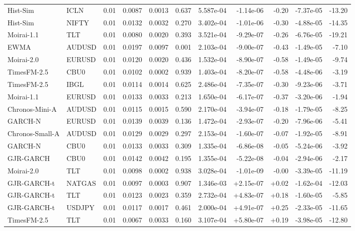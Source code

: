 \begin{tabular}{llrrrrrrrrr}
Hist-Sim & ICLN & 0.01 & 0.0087 & 0.0013 & 0.637 & 5.587e-04 & -1.14e-06 & -0.20 & -7.37e-05 & -13.20 \\
Hist-Sim & NIFTY & 0.01 & 0.0132 & 0.0032 & 0.270 & 3.402e-04 & -1.01e-06 & -0.30 & -4.88e-05 & -14.35 \\
Moirai-1.1 & TLT & 0.01 & 0.0080 & 0.0020 & 0.393 & 3.521e-04 & -9.29e-07 & -0.26 & -6.76e-05 & -19.21 \\
EWMA & AUDUSD & 0.01 & 0.0197 & 0.0097 & 0.001 & 2.103e-04 & -9.00e-07 & -0.43 & -1.49e-05 & -7.10 \\
Moirai-2.0 & EURUSD & 0.01 & 0.0120 & 0.0020 & 0.436 & 1.532e-04 & -8.90e-07 & -0.58 & -1.49e-05 & -9.74 \\
TimesFM-2.5 & CBU0 & 0.01 & 0.0102 & 0.0002 & 0.939 & 1.403e-04 & -8.20e-07 & -0.58 & -4.48e-06 & -3.19 \\
TimesFM-2.5 & IBGL & 0.01 & 0.0114 & 0.0014 & 0.625 & 2.486e-04 & -7.35e-07 & -0.30 & -9.23e-06 & -3.71 \\
Moirai-1.1 & EURUSD & 0.01 & 0.0133 & 0.0033 & 0.213 & 1.650e-04 & -6.17e-07 & -0.37 & -3.20e-06 & -1.94 \\
Chronos-Mini-A & AUDUSD & 0.01 & 0.0115 & 0.0015 & 0.590 & 2.170e-04 & -3.94e-07 & -0.18 & -1.79e-05 & -8.25 \\
GARCH-N & EURUSD & 0.01 & 0.0139 & 0.0039 & 0.136 & 1.472e-04 & -2.93e-07 & -0.20 & -7.96e-06 & -5.41 \\
Chronos-Small-A & AUDUSD & 0.01 & 0.0129 & 0.0029 & 0.297 & 2.153e-04 & -1.60e-07 & -0.07 & -1.92e-05 & -8.91 \\
GARCH-N & CBU0 & 0.01 & 0.0133 & 0.0033 & 0.309 & 1.335e-04 & -6.86e-08 & -0.05 & -5.24e-06 & -3.92 \\
GJR-GARCH & CBU0 & 0.01 & 0.0142 & 0.0042 & 0.195 & 1.355e-04 & -5.22e-08 & -0.04 & -2.94e-06 & -2.17 \\
Moirai-2.0 & TLT & 0.01 & 0.0098 & 0.0002 & 0.938 & 3.028e-04 & -1.01e-09 & -0.00 & -3.39e-05 & -11.19 \\
GJR-GARCH-t & NATGAS & 0.01 & 0.0097 & 0.0003 & 0.907 & 1.346e-03 & +2.15e-07 & +0.02 & -1.62e-04 & -12.03 \\
GJR-GARCH-t & TLT & 0.01 & 0.0123 & 0.0023 & 0.359 & 2.732e-04 & +4.83e-07 & +0.18 & -1.60e-05 & -5.85 \\
GJR-GARCH-t & USDJPY & 0.01 & 0.0117 & 0.0017 & 0.461 & 2.000e-04 & +4.91e-07 & +0.25 & -2.33e-05 & -11.65 \\
TimesFM-2.5 & TLT & 0.01 & 0.0067 & 0.0033 & 0.160 & 3.107e-04 & +5.80e-07 & +0.19 & -3.98e-05 & -12.80 \\

\end{tabular}
